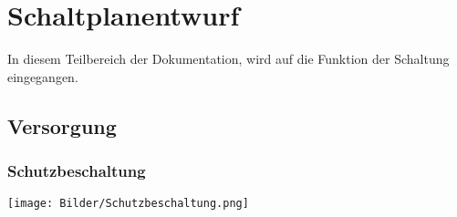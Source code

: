 \documentclass[a4paper,11pt]{scrartcl}
\begin{document}

\section{Schaltplanentwurf}

\begin{center}
In diesem Teilbereich der Dokumentation, wird auf die Funktion der Schaltung eingegangen. 
\end{center}

\subsection{Versorgung}

\subsubsection{Schutzbeschaltung}

\begin{center}
\texttt{[image: Bilder/Schutzbeschaltung.png]}
\end{center}
\end{document}
